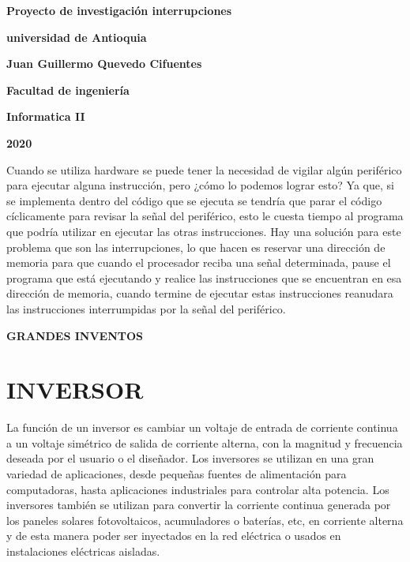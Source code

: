 \documentclass[12pt]{article}
\begin{document}
\begin{center}
\bf{\sc\Huge Proyecto de investigación interrupciones}\\
\end{center}
\vspace{60pt}
\begin{center}
\bf{\sc\Huge universidad de Antioquia}\\
\end{center}
\vspace{120pt}
\begin{center}
\bf{\sc\Huge Juan Guillermo Quevedo Cifuentes }\\
\end{center}
\vspace{120pt}
\begin{center}
\bf{\sc\Huge Facultad de ingeniería}
\end{center}
\vspace{5pt}
\begin{center}
\bf{\sc\Huge Informatica II}
\end{center}
\vspace{5pt}
\begin{center}
\bf{\sc\Huge 2020}\\
\end{center}
\newpage

\large
Cuando se utiliza hardware se puede tener la necesidad de vigilar algún periférico para ejecutar alguna instrucción, pero ¿cómo lo podemos lograr esto? Ya que, si se implementa dentro del código que se ejecuta se tendría que parar el código cíclicamente para revisar la señal del periférico, esto le cuesta tiempo al programa que podría utilizar en ejecutar las otras instrucciones. Hay una solución para este problema que son las interrupciones, lo que hacen es reservar una dirección de memoria para que cuando el procesador reciba una señal determinada, pause el programa que está ejecutando y realice las instrucciones que se encuentran en esa dirección de memoria, cuando termine de ejecutar estas instrucciones reanudara las instrucciones interrumpidas por la señal del periférico.\cite{maria2018microprocesadores}


\newpage
\bf{\sc\Huge GRANDES INVENTOS}
\section{INVERSOR}
\large
La función de un inversor es cambiar un voltaje de entrada de corriente continua a un voltaje simétrico de salida de corriente alterna, con la magnitud y frecuencia deseada por el usuario o el diseñador. Los inversores se utilizan en una gran variedad de aplicaciones, desde pequeñas fuentes de alimentación para computadoras, hasta aplicaciones industriales para controlar alta potencia. Los inversores también se utilizan para convertir la corriente continua generada por los paneles solares fotovoltaicos, acumuladores o baterías, etc, en corriente alterna y de esta manera poder ser inyectados en la red eléctrica o usados en instalaciones eléctricas aisladas.
\end{document}
